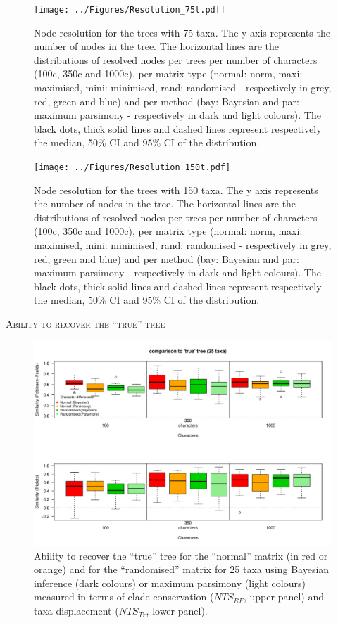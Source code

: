 \documentclass[12pt,letterpaper]{article}
\renewcommand{\section}[1]{%
\bigskip
\begin{center}
\begin{Large}
\normalfont\scshape #1
\medskip
\end{Large}
\end{center}}
\begin{document}
\begin{figure}[!htbp]
\centering
   \texttt{[image: ../Figures/Resolution\_75t.pdf]}
\caption{Node resolution for the trees with 75 taxa. The y axis represents the number of nodes in the tree. The horizontal lines are the distributions of resolved nodes per trees per number of characters (100c, 350c and 1000c), per matrix type (normal: norm, maxi: maximised, mini: minimised, rand: randomised - respectively in grey, red, green and blue) and per method (bay: Bayesian and par: maximum parsimony - respectively in dark and light colours). The black dots, thick solid lines and dashed lines represent respectively the median, 50\% CI and 95\% CI of the distribution.}
\label{Fig:Resolution_75t}
\end{figure}

\begin{figure}[!htbp]
\centering
   \texttt{[image: ../Figures/Resolution\_150t.pdf]}
\caption{Node resolution for the trees with 150 taxa. The y axis represents the number of nodes in the tree. The horizontal lines are the distributions of resolved nodes per trees per number of characters (100c, 350c and 1000c), per matrix type (normal: norm, maxi: maximised, mini: minimised, rand: randomised - respectively in grey, red, green and blue) and per method (bay: Bayesian and par: maximum parsimony - respectively in dark and light colours). The black dots, thick solid lines and dashed lines represent respectively the median, 50\% CI and 95\% CI of the distribution.}
\label{Fig:Resolution_150t}
\end{figure}

\newpage

\section{Ability to recover the ``true'' tree}


\begin{figure}[!htbp]
\centering
   \includegraphics[width=1\textwidth]{../Figures/25t_true_tree.pdf}
\caption{Ability to recover the ``true'' tree for the ``normal'' matrix (in red or orange) and for the ``randomised'' matrix for 25 taxa using Bayesian inference (dark colours) or maximum parsimony (light colours) measured in terms of clade conservation ($NTS_{RF}$, upper panel) and taxa displacement ($NTS_{Tr}$, lower panel).}
\end{figure}
\end{document}
